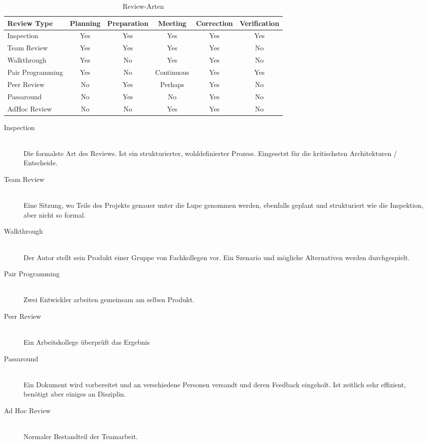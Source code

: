 \begin{table}[h!]
	\centering
	\begin{tabular}{|l|c|c|c|c|c|}
		\hline Review Type 		& Planning 	& Preparation 	& Meeting 		& Correction 	& Verification 	\\ 
		\hline Inspection 		& Yes 		& Yes 			& Yes 			& Yes 			& Yes 			\\ 
		\hline Team Review 		& Yes 		& Yes 			& Yes 			& Yes 			& No 			\\ 
		\hline Walkthrough 		& Yes 		& No 			& Yes 			& Yes 			& No 			\\ 
		\hline Pair Programming & Yes 		& No 			& Continuous 	& Yes 			& Yes 			\\ 
		\hline Peer Review 		& No 		& Yes 			& Perhaps 		& Yes 			& No 			\\ 
		\hline Passaround 		& No 		& Yes 			& No 			& Yes 			& No 			\\ 
		\hline AdHoc Review 	& No 		& No 			& Yes 			& Yes 			& No			\\ 
		\hline 
	\end{tabular}
	\caption{Review-Arten}
	\label{tab:reviewarten}
\end{table}
\begin{description}
  \item[Inspection] \hfill \\
  Die formalste Art des Reviews. Ist ein strukturierter, wohldefinierter Prozess. Eingesetzt für die kritischsten Architekturen / Entscheide.
  \item[Team Review] \hfill \\
  Eine Sitzung, wo Teile des Projekts genauer unter die Lupe genommen werden, ebenfalls geplant und strukturiert wie die Inspektion, aber nicht so formal.
  \item[Walkthrough] \hfill \\
  Der Autor stellt sein Produkt einer Gruppe von Fachkollegen vor. Ein Szenario und mögliche Alternativen werden durchgespielt.
  \item[Pair Programming] \hfill \\
  Zwei Entwickler arbeiten gemeinsam am selben Produkt.
  \item[Peer Review] \hfill \\
  Ein Arbeitskollege überprüft das Ergebnis
  \item[Passaround] \hfill \\
  Ein Dokument wird vorbereitet und an verschiedene Personen versandt und deren Feedback eingeholt. Ist zeitlich sehr effizient, benötigt aber einiges an Disziplin.
  \item[Ad Hoc Review] \hfill \\
  Normaler Bestandteil der Teamarbeit.
\end{description}

